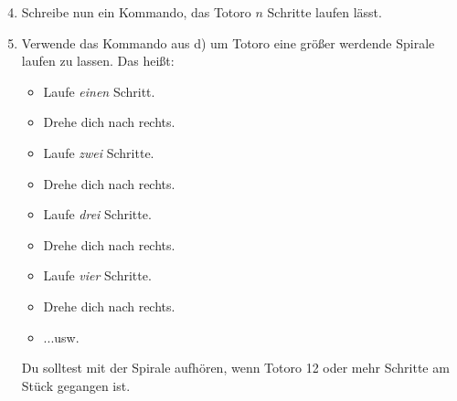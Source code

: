 \begin{enumerate}\setcounter{enumi}{3}
	\item
		Schreibe nun ein Kommando, das Totoro $n$ Schritte laufen lässt.

	\item
		Verwende das Kommando aus d) um Totoro eine größer werdende Spirale laufen zu lassen.
		Das heißt:

		\begin{itemize}
			\item[] Laufe \emph{einen} Schritt.
			\item[] Drehe dich nach rechts.
			\item[] Laufe \emph{zwei} Schritte.
			\item[] Drehe dich nach rechts.
			\item[] Laufe \emph{drei} Schritte.
			\item[] Drehe dich nach rechts.
			\item[] Laufe \emph{vier} Schritte.
			\item[] Drehe dich nach rechts.
			\item[] ...usw.
		\end{itemize}

		Du solltest mit der Spirale aufhören, wenn Totoro 12 oder mehr Schritte am Stück gegangen ist.
\end{enumerate}

\newpage
